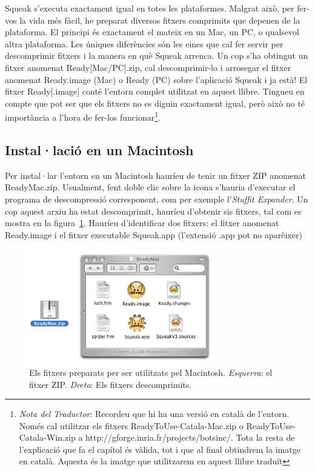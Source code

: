 Squeak s'executa exactament igual en totes les plataformes. Malgrat això, per fer-vos la vida més fàcil, he preparat diversos fitxers comprimits que depenen de la plataforma. El principi és exactament el mateix en un Mac, un PC, o qualsevol altra plataforma. Les úniques diferències són les eines que cal fer servir per descomprimir fitxers i la manera en què Squeak arrenca. Un cop s'ha obtingut un fitxer anomenat \textsf{Ready[Mac/PC].zip}, cal descomprimir-lo i arrosegar el fitxer anomenat \textsf{Ready.image} (Mac) o \textsf{Ready} (PC) sobre l'aplicació \textsf{Squeak} i ja està! El fitxer \textsf{Ready}[\textsf{.image}] conté l'entorn complet utilitzat en aquest llibre. Tingueu en compte que pot ser que els fitxers no es diguin exactament igual, però això no té importància a l'hora de fer-los funcionar\footnote{\emph{Nota del Traductor}: Recordeu que hi ha una versió en català de l'entorn. Només cal utilitzar els fitxers \textsf{ReadyToUse-Catala-Mac.zip} o \textsf{ReadyToUse-Catala-Win.zip} a \textsf{http://gforge.inria.fr/projects/botsinc/}. Tota la resta de l'explicació que fa el capítol és vàlida, tot i que al final obtindrem la imatge en català. Aquesta és la imatge que utilitzarem en aquest llibre traduït}.

\subsection{Instal·lació en un Macintosh}
Per instal·lar l'entorn en un Macintosh hauríeu de tenir un fitxer ZIP anomenat \textsf{ReadyMac.zip}. Usualment, fent doble clic sobre la icona s'hauria d'executar el programa de descompressió corresponent, com per exemple l'\emph{Stuffit Expander}. Un cop aquest arxiu ha estat descomprimit, hauríeu d'obtenir sis fitxers, tal com es mostra en la figura~\ref{fig0101}. Hauríeu d'identificar dos fitxers: el fitxer anomenat \textsf{Ready.image} i el fitxer executable \textsf{Squeak.app} (l'extensió \textsf{.app} pot no aparèixer)

\begin{figure}[h]
\begin{center}
\includegraphics[height=50mm ,width=82mm ]{Imatges/CarpetaReadyMac.png}
\end{center}
\caption{Els fitxers preparats per ser utilitzats pel Macintosh. \emph{Esquerra}: el fitxer ZIP. \emph{Dreta}: Els fitxers descomprimits.}
\label{fig0101}
\end{figure}

